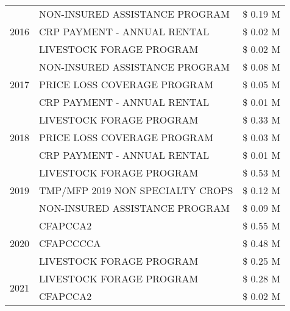 \begin{tabular}{llr}
\cline{1-3}
\multirow[t]{3}{*}{2016} & NON-INSURED ASSISTANCE PROGRAM & \$ 0.19 M \\
 & CRP PAYMENT - ANNUAL RENTAL & \$ 0.02 M \\
 & LIVESTOCK FORAGE PROGRAM & \$ 0.02 M \\
\cline{1-3}
\multirow[t]{3}{*}{2017} & NON-INSURED ASSISTANCE PROGRAM & \$ 0.08 M \\
 & PRICE LOSS COVERAGE PROGRAM & \$ 0.05 M \\
 & CRP PAYMENT - ANNUAL RENTAL & \$ 0.01 M \\
\cline{1-3}
\multirow[t]{3}{*}{2018} & LIVESTOCK FORAGE PROGRAM & \$ 0.33 M \\
 & PRICE LOSS COVERAGE PROGRAM & \$ 0.03 M \\
 & CRP PAYMENT - ANNUAL RENTAL & \$ 0.01 M \\
\cline{1-3}
\multirow[t]{3}{*}{2019} & LIVESTOCK FORAGE PROGRAM & \$ 0.53 M \\
 & TMP/MFP 2019 NON SPECIALTY CROPS & \$ 0.12 M \\
 & NON-INSURED ASSISTANCE PROGRAM & \$ 0.09 M \\
\cline{1-3}
\multirow[t]{3}{*}{2020} & CFAPCCA2 & \$ 0.55 M \\
 & CFAPCCCCA & \$ 0.48 M \\
 & LIVESTOCK FORAGE PROGRAM & \$ 0.25 M \\
\cline{1-3}
\multirow[t]{2}{*}{2021} & LIVESTOCK FORAGE PROGRAM & \$ 0.28 M \\
 & CFAPCCA2 & \$ 0.02 M \\
\cline{1-3}
\bottomrule
\end{tabular}
